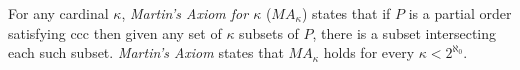 \documentclass[12pt]{article}
\begin{document}
For any cardinal $\kappa$, \emph{Martin's Axiom for $\kappa$} ($MA_\kappa$) states that if $P$ is a partial order satisfying ccc then given any set of $\kappa$  subsets of $P$, there is a  subset intersecting each such subset.  \emph{Martin's Axiom} states that $MA_\kappa$ holds for every $\kappa<2^{\aleph_0}$.
\end{document}
